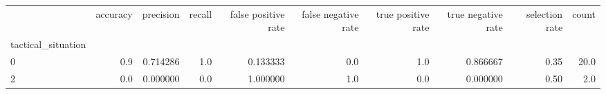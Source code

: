 \begin{tabular}{lrrrrrrrrr}
\toprule
{} &  accuracy &  precision &  recall &  false positive rate &  false negative rate &  true positive rate &  true negative rate &  selection rate &  count \\
tactical\_situation &           &            &         &                      &                      &                     &                     &                 &        \\
\midrule
0                  &       0.9 &   0.714286 &     1.0 &             0.133333 &                  0.0 &                 1.0 &            0.866667 &            0.35 &   20.0 \\
2                  &       0.0 &   0.000000 &     0.0 &             1.000000 &                  1.0 &                 0.0 &            0.000000 &            0.50 &    2.0 \\
\bottomrule
\end{tabular}
